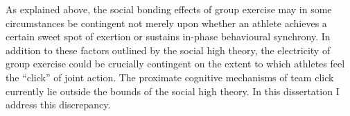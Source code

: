 As explained above, the social bonding effects of group exercise may in some circumstances be contingent not merely upon whether an athlete achieves a certain sweet spot of exertion or sustains in-phase behavioural synchrony.  In addition to these factors outlined by the social high theory, the electricity of group exercise could be crucially contingent on the extent to which athletes feel the ``click'' of joint action.  The proximate cognitive mechanisms of team click currently lie outside the bounds of the social high theory.  In this dissertation I address this discrepancy.





